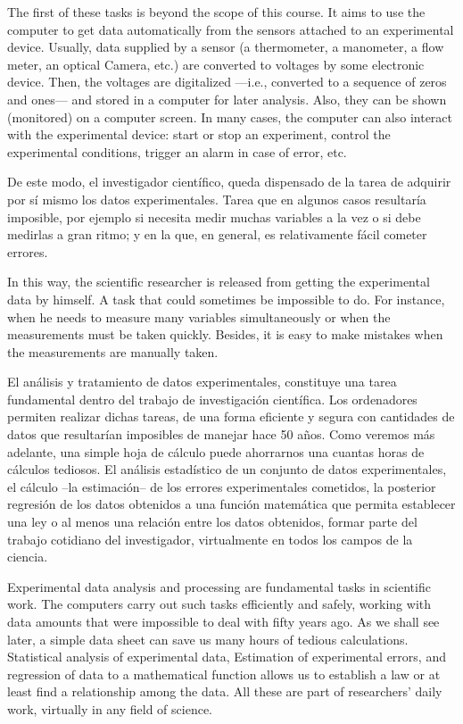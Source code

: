 \begin{paracol}{2}
\switchcolumn
The first of these tasks is beyond the scope of this course. It aims to use the computer to get data automatically from the sensors attached to an experimental device. Usually, data supplied by a sensor (a thermometer, a manometer, a flow meter, an optical Camera, etc.) are converted to voltages by some electronic device. Then, the voltages are digitalized ---i.e., converted to a sequence of zeros and ones---  and stored in a computer for later analysis. Also, they can be shown (monitored) on a computer screen. In many cases, the computer can also interact with the experimental device: start or stop an experiment, control the experimental conditions, trigger an alarm in case of error, etc.          

\switchcolumn
De este modo, el investigador científico, queda dispensado de la tarea de adquirir por sí mismo los datos experimentales. Tarea que en algunos casos resultaría imposible, por ejemplo si necesita medir muchas variables a la vez o si debe medirlas a gran ritmo; y en la que, en general, es relativamente fácil cometer errores.

\switchcolumn
In this way, the scientific researcher is released from getting the experimental data by himself. A task that could sometimes be impossible to do. For instance, when he needs to measure many variables simultaneously or when the measurements must be taken quickly. Besides, it is easy to make mistakes when the measurements are manually taken.     

\switchcolumn
El análisis y tratamiento de datos experimentales, constituye una tarea fundamental dentro del trabajo de investigación científica. Los ordenadores permiten realizar dichas tareas, de una forma eficiente y segura con cantidades de datos que resultarían imposibles de manejar hace 50 años. Como veremos más adelante, una simple hoja de cálculo puede ahorrarnos una cuantas horas de cálculos tediosos. El análisis estadístico de un conjunto de datos experimentales, el cálculo --la estimación-- de los errores experimentales cometidos, la posterior regresión de los datos obtenidos a una función matemática que permita establecer una ley o al menos una relación entre los datos obtenidos, formar parte del trabajo cotidiano del investigador, virtualmente en todos los campos de la ciencia.

\switchcolumn
Experimental data analysis and processing are fundamental tasks in scientific work. The computers carry out such tasks efficiently and safely, working with data amounts that were impossible to deal with fifty years ago. As we shall see later, a simple data sheet can save us many hours of tedious calculations. Statistical analysis of experimental data, Estimation of experimental errors, and regression of data to a mathematical function allows us to establish a law or at least find a relationship among the data. All these are part of researchers' daily work, virtually in any field of science.  
     

\end{paracol}
